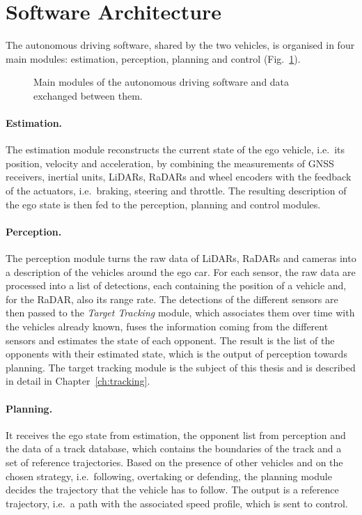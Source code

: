 \FloatBarrier

\section{Software Architecture}
\label{sec:sw_arch}

The autonomous driving software, shared by the two vehicles, is organised in four
main modules: estimation, perception, planning and control (Fig.~\ref{fig:sw_arch}).

\begin{figure}[H]
    \centering
    
    \caption{Main modules of the autonomous driving software and data exchanged between
    them.}
    \label{fig:sw_arch}
\end{figure}

\paragraph{Estimation.} The estimation module reconstructs the current state of the ego
vehicle, i.e.\ its position, velocity and acceleration, by combining the measurements of
GNSS receivers, inertial units, LiDARs, RaDARs and wheel encoders with the feedback of
the actuators, i.e.\ braking, steering and throttle. The resulting description of the ego
state is then fed to the perception, planning and control modules.

\paragraph{Perception.}The perception module turns the raw data of LiDARs, RaDARs and cameras into a description of the vehicles around the ego car. For each sensor, the raw data are processed into a list of detections, each containing the position of a vehicle and, for the RaDAR, also its range rate. The detections of the different sensors are then passed to
the \emph{Target Tracking} module, which associates them over time with the vehicles
already known, fuses the information coming from the different sensors and estimates
the state of each opponent. The result is
the list of the opponents with their estimated state, which is the output of perception towards planning. The target
tracking module is the subject of this thesis and is described in detail in
Chapter~\ref{ch:tracking}.

\paragraph{Planning.} It receives the ego state from estimation, the opponent list
from perception and the data of a track database, which contains the
boundaries of the track and a set of reference trajectories. Based on the presence of
other vehicles and on the chosen strategy, i.e.\ following, overtaking or defending,
the planning module decides the trajectory that the vehicle has to follow. The output is a reference trajectory,
i.e.\ a path with the associated speed profile, which is sent to control.


